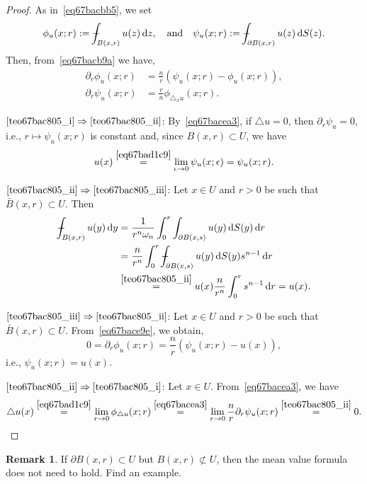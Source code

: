 \documentclass[a4paper,9pt]{amsart}
\newcommand{\did}{\,\mathrm{d}}	%
\newcommand{\de}{\partial}		%
\newcommand{\THEN}{\Rightarrow}	%
\newcommand{\laplacian}{\triangle}
\def\Xint#1{\mathchoice
      {\XXint\displaystyle\textstyle{#1}}%
      {\XXint\textstyle\scriptstyle{#1}}%
      {\XXint\scriptstyle\scriptscriptstyle{#1}}%
      {\XXint\scriptscriptstyle\scriptscriptstyle{#1}}%
      \!\int}
\def\XXint#1#2#3{{\setbox0=\hbox{$#1{#2#3}{\int}$}
        \vcenter{\hbox{$#2#3$}}\kern-.5\wd0}}
\def\fint{\Xint-}
\theoremstyle{plain}
\theoremstyle{definition}
\newtheorem{remark}[proposition]{Remark}
\theoremstyle{remark}
\begin{document}
\begin{proof}
	As in~\eqref{eq67bacbb5}, we set 
	\[
	\phi_u(x;r) := \fint_{B(x,r)} u(z) \did z ,
	\quad\text{and}\quad
	\psi_u(x;r) := \fint_{\de B(x,r)} u(z) \did S(z) .
	\]
	Then, from~\eqref{eq67bacb9a} we have,
	\begin{align}
		\label{eq67bace9e}
		\de_r\phi_u(x;r) &= \frac{n}{r} (\psi_u(x;r)- \phi_u(x;r) ) , \\
		\label{eq67bacea3}
		\de_r\psi_u(x;r) &= \frac{r}{n} \phi_{\laplacian_xu}(x;r) .
	\end{align}
	
	$\ref{teo67bac805_i}\THEN\ref{teo67bac805_ii}$:
	By~\eqref{eq67bacea3}, if $\laplacian u=0$, then $\de_r\psi_u=0$, i.e., $r\mapsto\psi_u(x;r)$ is constant and, since $B(x,r)\subset U$, we have
	\[
	u(x) 
	\overset{\eqref{eq67bad1c9}}= \lim_{\epsilon\to0} \psi_u(x;\epsilon) 
	= \psi_u(x;r) .
	\]
	
	$\ref{teo67bac805_ii}\THEN\ref{teo67bac805_iii}$:
	Let $x\in U$ and $r>0$ be such that $\bar B(x,r)\subset U$.
	Then
	\begin{align*}
		\fint_{B(x,r)} u(y) \did y
		&= \frac1{r^n\omega_n } \int_0^r \int_{\de B(x,s)} u(y) \did S(y)\did r \\
		&= \frac{n}{r^n} \int_0^r \fint_{\de B(x,s)} u(y) \did S(y) s^{n-1}\did r \\
		&\overset{\ref{teo67bac805_ii}}= u(x) \frac{n}{r^n} \int_0^r s^{n-1}\did r 
		= u(x) .
	\end{align*}
	
	$\ref{teo67bac805_iii}\THEN\ref{teo67bac805_ii}$:
	Let $x\in U$ and $r>0$ be such that $\bar B(x,r)\subset U$.
	From~\eqref{eq67bace9e}, we obtain,
	\[
	0 = \de_r\phi_u(x;r) 
	= \frac{n}{r} (\psi_u(x;r)- u(x) ) ,
	\]
	i.e., $\psi_u(x;r) = u(x)$.
	
	$\ref{teo67bac805_ii}\THEN\ref{teo67bac805_i}$:
	Let $x\in U$. 
	From~\eqref{eq67bacea3}, we have
	\[
	\laplacian u(x) 
	\overset{\eqref{eq67bad1c9}}= \lim_{r\to0} \phi_{\laplacian u}(x;r) 
	\overset{\eqref{eq67bacea3}}= \lim_{r\to0} \frac{n}{r}\de_r\psi_u(x;r)
	\overset{\ref{teo67bac805_ii}}= 0 .
	\]
\end{proof}

\begin{remark}
	If $\de B(x,r)\subset U$ but $B(x,r)\not\subset U$, then the mean value formula does not need to hold.
	Find an example.
\end{remark} 
\end{document}
